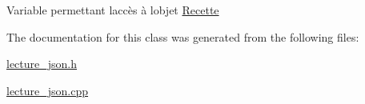 Variable permettant l\textquotesingle{}accès à l\textquotesingle{}objet \hyperlink{classRecette}{Recette} 

The documentation for this class was generated from the following files\+:\begin{DoxyCompactItemize}
\item 
\hyperlink{lecture__json_8h}{lecture\+\_\+json.\+h}\item 
\hyperlink{lecture__json_8cpp}{lecture\+\_\+json.\+cpp}\end{DoxyCompactItemize}
